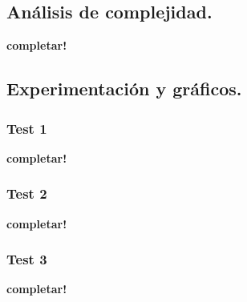 \newpage
\subsection{Análisis de complejidad.}

\vspace*{0.3cm}

\textbf{completar!}



\newpage
\subsection{Experimentación y gráficos.}

\vspace*{0.3cm}

\subsubsection{Test 1}

\vspace*{0.3cm}

\textbf{completar!}


\newpage
\subsubsection{Test 2}

\vspace*{0.3cm}

\textbf{completar!}


\newpage
\subsubsection{Test 3}

\vspace*{0.3cm}

\textbf{completar!}

